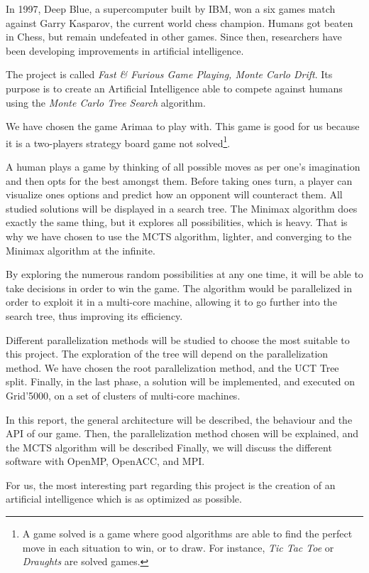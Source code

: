 
In 1997, Deep Blue, a supercomputer built by IBM, won a six games match against Garry Kasparov, the current world chess champion. Humans got beaten in Chess, but remain undefeated in other games. Since then, researchers have been developing improvements in artificial intelligence.
\newline

The project is called \emph{Fast \& Furious Game Playing, Monte Carlo Drift}. Its purpose is to create an Artificial Intelligence able to compete against humans using the \emph{Monte Carlo Tree Search} algorithm.
\newline

We have chosen the game Arimaa to play with. This game is good for us because it is a two-players strategy board game not solved\footnote{A game solved is a game where good algorithms are able to find the perfect move in each situation to win, or to draw. For instance, \textit{Tic Tac Toe} or \textit{Draughts} are solved games.}.
\newline

A human plays a game by thinking of all possible moves as per one's imagination and then opts for the best amongst them. Before taking ones turn, a player can visualize ones options and predict how an opponent will counteract them. All studied solutions will be displayed in a search tree. The Minimax algorithm does exactly the same thing, but it explores all possibilities, which is heavy. That is why we have chosen to use the MCTS algorithm, lighter, and converging to the Minimax algorithm at the infinite.
\newline

By exploring the numerous random possibilities at any one time, it will be able to take decisions in order to win the game.
The algorithm would be parallelized in order to exploit it in a multi-core machine, allowing it to go further into the search tree, thus improving its efficiency.
\newline

Different parallelization methods will be studied to choose the most suitable to this project.
The exploration of the tree will depend on the parallelization method. We have chosen the root parallelization method, and the UCT Tree split.
Finally, in the last phase, a solution will be implemented, and executed on Grid'5000, on a set of clusters of multi-core machines.
\newline


In this report, the general architecture will be described, the behaviour and the API of our game.
Then, the parallelization method chosen will be explained, and the MCTS algorithm will be described
Finally, we will discuss the different software with OpenMP, OpenACC, and MPI.

For us, the most interesting part regarding this project is the creation of an artificial intelligence which is as optimized as possible.